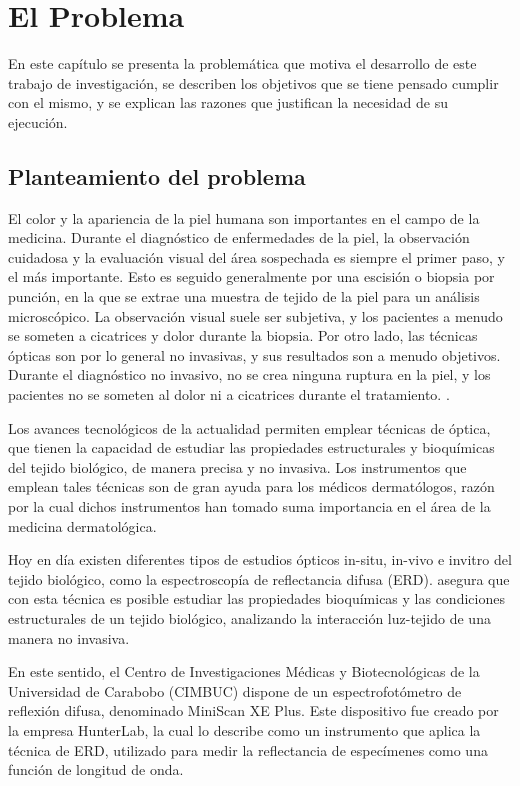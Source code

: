 \chapter{El Problema}

En este cap\'{i}tulo se presenta la problem\'{a}tica que motiva el desarrollo de este trabajo de investigaci\'{o}n, se describen los objetivos que se tiene pensado cumplir con el mismo, y se explican las razones que justifican la necesidad de su ejecuci\'{o}n.

	\section{Planteamiento del problema}	
El color y la apariencia de la piel humana son importantes en el campo de la medicina. Durante el diagn\'{o}stico de enfermedades de la piel, la observaci\'{o}n cuidadosa y la evaluaci\'{o}n visual del \'{a}rea sospechada es siempre el primer paso, y el m\'{a}s importante. Esto es seguido generalmente por una escisi\'{o}n o biopsia por punci\'{o}n, en la que se extrae una muestra de tejido de la piel para un an\'{a}lisis microsc\'{o}pico. La observaci\'{o}n visual suele ser subjetiva, y los pacientes a menudo se someten a cicatrices y dolor durante la biopsia. Por otro lado, las t\'{e}cnicas \'{o}pticas son por lo general no invasivas, y sus resultados son a menudo objetivos. Durante el diagn\'{o}stico no invasivo, no se crea ninguna ruptura en la piel, y los pacientes no se someten al dolor ni a cicatrices durante el tratamiento. \cite{Bersha}.

Los avances tecnol\'{o}gicos de la actualidad permiten emplear t\'{e}cnicas de \'{o}ptica, que tienen la capacidad de estudiar  las propiedades estructurales y bioqu\'{i}micas del tejido biol\'{o}gico, de manera precisa y no invasiva. Los instrumentos que emplean tales t\'{e}cnicas son de gran ayuda para los m\'{e}dicos dermat\'{o}logos, raz\'{o}n por la cual dichos instrumentos han tomado suma importancia en el \'{a}rea de la medicina dermatol\'{o}gica.

Hoy en d\'{i}a existen diferentes tipos de estudios \'{o}pticos in-situ, in-vivo e invitro del tejido biol\'{o}gico, como la espectroscop\'{i}a de reflectancia difusa (ERD). \cite{Perez} asegura que con esta t\'{e}cnica es  posible estudiar las propiedades bioqu\'{i}micas y las condiciones estructurales de un tejido biol\'{o}gico, analizando la interacci\'{o}n luz-tejido de una manera no invasiva.

En este sentido, el Centro de Investigaciones M\'{e}dicas y Biotecnol\'{o}gicas de la Universidad de Carabobo (CIMBUC) dispone de un espectrofot\'{o}metro de reflexi\'{o}n difusa, denominado MiniScan XE Plus. Este dispositivo fue creado por la empresa HunterLab, la cual lo describe como un instrumento que aplica la t\'{e}cnica de ERD, utilizado para medir la reflectancia de espec\'{i}menes como una funci\'{o}n de longitud de onda.

